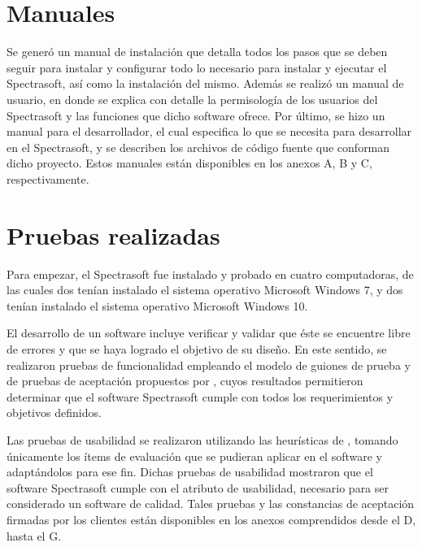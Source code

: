 \newpage
\section{Manuales}
	Se gener\'{o} un manual de instalaci\'{o}n que detalla todos los pasos que se deben seguir para instalar y configurar todo lo necesario para instalar y ejecutar el Spectrasoft, as\'{i} como la instalaci\'{o}n del mismo. Adem\'{a}s se realiz\'{o} un manual de usuario, en donde se explica con detalle la permisolog\'{i}a de los usuarios del Spectrasoft y las funciones que dicho software ofrece. Por \'{u}ltimo, se hizo un manual para el desarrollador, el cual especifica lo que se necesita para desarrollar en el Spectrasoft, y se describen los archivos de c\'{o}digo fuente que conforman dicho proyecto. Estos manuales est\'{a}n disponibles en los anexos A, B y C, respectivamente.

\section{Pruebas realizadas}
	Para empezar, el Spectrasoft fue instalado y probado en cuatro computadoras, de las cuales dos ten\'{i}an instalado el sistema operativo Microsoft Windows 7, y dos ten\'{i}an instalado el sistema operativo Microsoft Windows 10.
	
	El desarrollo de un software incluye verificar y validar que \'{e}ste se encuentre libre de errores y que se haya logrado el objetivo de su dise\~{n}o. En este sentido, se realizaron pruebas de funcionalidad empleando el modelo de guiones de prueba y de pruebas de aceptaci\'{o}n propuestos por , cuyos resultados permitieron determinar que el software Spectrasoft cumple con todos los requerimientos y objetivos definidos.
	
	Las pruebas de usabilidad se realizaron utilizando las heur\'{i}sticas de , tomando \'{u}nicamente los \'{i}tems de evaluaci\'{o}n que se pudieran aplicar en el software y adapt\'{a}ndolos para ese fin. Dichas pruebas de usabilidad mostraron que el software Spectrasoft cumple con el atributo de usabilidad, necesario para ser considerado un software de calidad. Tales pruebas y las constancias de aceptaci\'{o}n firmadas por los clientes est\'{a}n disponibles en los anexos comprendidos desde el D, hasta el G.
	
